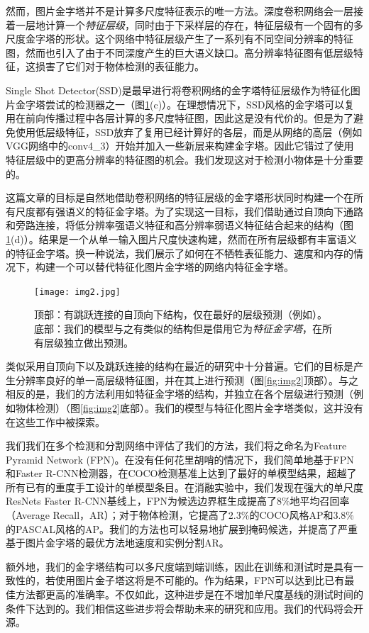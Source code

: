 \documentclass[../main.tex]{subfile}
\begin{document}
然而，图片金字塔并不是计算多尺度特征表示的唯一方法。深度卷积网络会一层接着一层地计算一个\textit{特征层级}，同时由于下采样层的存在，特征层级有一个固有的多尺度金字塔的形状。这个网络中特征层级产生了一系列有不同空间分辨率的特征图，然而也引入了由于不同深度产生的巨大语义缺口。高分辨率特征图有低层级特征，这损害了它们对于物体检测的表征能力。

Single Shot Detector(SSD)是最早进行将卷积网络的金字塔特征层级作为特征化图片金字塔尝试的检测器之一（图\ref{fig:img1}(c)）。在理想情况下，SSD风格的金字塔可以复用在前向传播过程中各层计算的多尺度特征图，因此这是没有代价的。但是为了避免使用低层级特征，SSD放弃了复用已经计算好的各层，而是从网络的高层（例如VGG网络中的conv4\_3）开始并加入一些新层来构建金字塔。因此它错过了使用特征层级中的更高分辨率的特征图的机会。我们发现这对于检测小物体是十分重要的。

这篇文章的目标是自然地借助卷积网络的特征层级的金字塔形状同时构建一个在所有尺度都有强语义的特征金字塔。为了实现这一目标，我们借助通过自顶向下通路和旁路连接，将低分辨率强语义特征和高分辨率弱语义特征结合起来的结构（图\ref{fig:img1}(d)）。结果是一个从单一输入图片尺度快速构建，然而在所有层级都有丰富语义的特征金字塔。换一种说法，我们展示了如何在不牺牲表征能力、速度和内存的情况下，构建一个可以替代特征化图片金字塔的网络内特征金字塔。

\begin{figure}[bh]
    \centering
    \texttt{[image: img2.jpg]}
    \caption{顶部：有跳跃连接的自顶向下结构，仅在最好的层级预测（例如\cite{28}）。底部：我们的模型与之有类似的结构但是借用它为\textit{特征金字塔}，在所有层级独立做出预测。}
    \label{fig:img1}
\end{figure}

类似采用自顶向下以及跳跃连接的结构在最近的研究中十分普遍。它们的目标是产生分辨率良好的单一高层级特征图，并在其上进行预测（图\ref{fig:img2}顶部）。与之相反的是，我们的方法利用如特征金字塔的结构，并独立在各个层级进行预测（例如物体检测）（图\ref{fig:img2}底部）。我们的模型与特征化图片金字塔类似，这并没有在这些工作中被探索。

我们我们在多个检测和分割网络\cite{11,29,27}中评估了我们的方法，我们将之命名为Feature Pyramid Network (FPN)。在没有任何花里胡哨的情况下，我们简单地基于FPN和Faster R-CNN检测器，在COCO检测基准上达到了最好的单模型结果，超越了所有已有的重度手工设计的单模型条目。在消融实验中，我们发现在强大的单尺度ResNets Faster R-CNN基线上，FPN为候选边界框生成提高了8\%地平均召回率（Average Recall，AR）；对于物体检测，它提高了2.3\%的COCO风格AP和3.8\%的PASCAL风格的AP。我们的方法也可以轻易地扩展到掩码候选，并提高了严重基于图片金字塔的最优方法地速度和实例分割AR。

额外地，我们的金字塔结构可以多尺度端到端训练，因此在训练和测试时是具有一致性的，若使用图片金子塔这将是不可能的。作为结果，FPN可以达到比已有最佳方法都更高的准确率。不仅如此，这种进步是在不增加单尺度基线的测试时间的条件下达到的。我们相信这些进步将会帮助未来的研究和应用。我们的代码将会开源。
\end{document}
